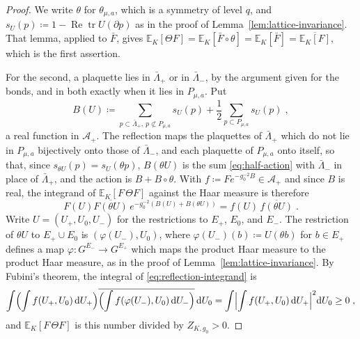 \documentclass[11pt]{preprint}
\newcommand{\dd}{\mathrm{d}}
\newcommand{\tr}{\operatorname{tr}}
\numberwithin{equation}{section}
\theoremstyle{definition}
\theoremstyle{remark}
\theoremstyle{plain}
\begin{document}
\begin{proof}
We write $\theta$ for $\theta_{\mu,a}$, which is a symmetry of level $q$, and $s_U(p) \coloneqq 1 - \operatorname{Re}\tr U(\partial p)$ as in the proof of Lemma~\ref{lem:lattice-invariance}. That lemma, applied to $\bar F$, gives $\mathbb E_K[\Theta F] = \mathbb E_K[\bar F \circ \theta] = \mathbb E_K[\bar F] = \overline{\mathbb E_K[F]}$, which is the first assertion.

For the second, a plaquette lies in $\bar\Lambda_+$ or in $\bar\Lambda_-$, by the argument given for the bonds, and in both exactly when it lies in $P_{\mu,a}$. Put
\begin{equation}\label{eq:half-action}
    B(U) \coloneqq \sum_{p \subset \bar\Lambda_+,\ p \not\subset P_{\mu,a}}s_U(p) + \frac12\sum_{p \subset P_{\mu,a}}s_U(p)\;,
\end{equation}
a real function in $\mathcal A_+$. The reflection maps the plaquettes of $\bar\Lambda_+$ which do not lie in $P_{\mu,a}$ bijectively onto those of $\bar\Lambda_-$, and each plaquette of $P_{\mu,a}$ onto itself, so that, since $s_{\theta U}(p) = s_U(\theta p)$, $B(\theta U)$ is the sum \eqref{eq:half-action} with $\bar\Lambda_-$ in place of $\bar\Lambda_+$, and the action is $B + B \circ \theta$. With $f \coloneqq Fe^{-g_0^{-2}B} \in \mathcal A_+$ and since $B$ is real, the integrand of $\mathbb E_K[F\,\Theta F]$ against the Haar measure is therefore
\begin{equation}\label{eq:reflection-integrand}
    F(U)\overline{F(\theta U)}\,e^{-g_0^{-2}(B(U) + B(\theta U))} = f(U)\,\overline{f(\theta U)}\;.
\end{equation}
Write $U = (U_+, U_0, U_-)$ for the restrictions to $E_+$, $E_0$, and $E_-$. The restriction of $\theta U$ to $E_+ \cup E_0$ is $(\varphi(U_-), U_0)$, where $\varphi(U_-)(b) \coloneqq U(\theta b)$ for $b \in E_+$ defines a map $\varphi \colon G^{E_-} \to G^{E_+}$ which maps the product Haar measure to the product Haar measure, as in the proof of Lemma~\ref{lem:lattice-invariance}. By Fubini's theorem, the integral of \eqref{eq:reflection-integrand} is
\begin{equation}\label{eq:reflection-square}
    \int\Bigl(\int f(U_+, U_0)\,\dd U_+\Bigr)\overline{\Bigl(\int f(\varphi(U_-), U_0)\,\dd U_-\Bigr)}\,\dd U_0 = \int\Bigl\lvert\int f(U_+, U_0)\,\dd U_+\Bigr\rvert^2\dd U_0 \geq 0\;,
\end{equation}
and $\mathbb E_K[F\,\Theta F]$ is this number divided by $Z_{K,g_0} > 0$.
\end{proof}
\end{document}
